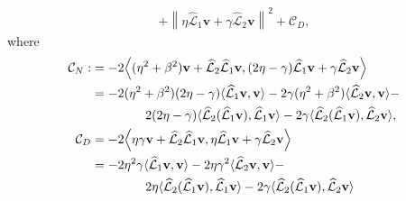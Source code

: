 \documentclass[a4paper,10pt]{article}
\begin{document}
{\begin{align}
{	+ \left\|\eta\widehat{\mathcal{L}}_1\mathbf{v} +
		\gamma \widehat{\mathcal{L}}_2\mathbf{v}\right\|^2 + \mathcal{C}_D},\label{eq:ratio}
\end{align}
%
where
%
\begin{align*}
\mathcal{C}_N :&= -2 \Big\langle (\eta^2+\beta^2) \mathbf{v} +
	\widehat{\mathcal{L}}_2\widehat{\mathcal{L}}_1\mathbf{v}, 
	(2\eta - \gamma)\widehat{\mathcal{L}}_1\mathbf{v} +
		\gamma \widehat{\mathcal{L}}_2\mathbf{v} \Big\rangle \\
& = -2(\eta^2+\beta^2)(2\eta-\gamma)\langle \widehat{\mathcal{L}}_1\mathbf{v},
	\mathbf{v}\rangle -2\gamma(\eta^2+\beta^2) \langle \widehat{\mathcal{L}}_2\mathbf{v},
	\mathbf{v}\rangle - \\ 
	& \hspace{10ex} 2(2\eta-\gamma)\langle \widehat{\mathcal{L}}_2
	(\widehat{\mathcal{L}}_1\mathbf{v}), \widehat{\mathcal{L}}_1\mathbf{v}\rangle
	- 2\gamma\langle \widehat{\mathcal{L}}_2
	(\widehat{\mathcal{L}}_1\mathbf{v}), \widehat{\mathcal{L}}_2\mathbf{v}\rangle, \\
\mathcal{C}_D &=  -2 \Big\langle \eta\gamma\mathbf{v} +
	\widehat{\mathcal{L}}_2\widehat{\mathcal{L}}_1\mathbf{v}, 
	\eta\widehat{\mathcal{L}}_1\mathbf{v} +
		\gamma \widehat{\mathcal{L}}_2\mathbf{v} \Big\rangle \\
& = -2\eta^2\gamma\langle \widehat{\mathcal{L}}_1\mathbf{v},
	\mathbf{v}\rangle -2\eta\gamma^2 \langle \widehat{\mathcal{L}}_2\mathbf{v},
	\mathbf{v}\rangle - \\ 
	& \hspace{10ex} 2\eta\langle \widehat{\mathcal{L}}_2
	(\widehat{\mathcal{L}}_1\mathbf{v}), \widehat{\mathcal{L}}_1\mathbf{v}\rangle
	- 2\gamma\langle \widehat{\mathcal{L}}_2
	(\widehat{\mathcal{L}}_1\mathbf{v}), \widehat{\mathcal{L}}_2\mathbf{v}\rangle
\end{align*}

}
\end{document}
